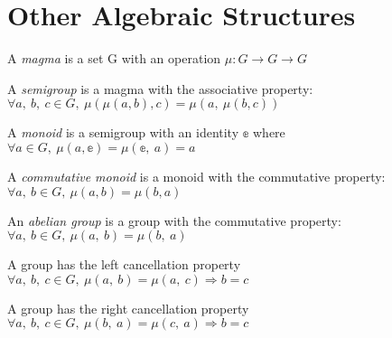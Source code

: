 \section{Other Algebraic Structures}

\begin{definition}[Magma]
    \label{definition : Magma}
    \leanok
    A \emph{magma} is a set G with an operation $\mu : G \rightarrow G \rightarrow G$
\end{definition}

\begin{definition}[Semigroup]
    \label{definition : Semigroup}
    \leanok
    A \emph{semigroup} is a magma with the associative property:
    $\forall a,~ b,~ c \in G, ~\mu(\mu(a, b), c) = \mu(a,~ \mu(b, c))$
\end{definition}

\begin{definition}[Monoid]
    \label{definition : Monoid}
    \leanok
    A \emph{monoid} is a semigroup with an identity $\mathbb{e}$ where
    $\forall a \in G, ~\mu (a, \mathbb{e}) = \mu(\mathbb{e},~ a) = a$
\end{definition}

\begin{definition}
    \label{definition : CommMonoid}
    \leanok
    A \emph{commutative monoid} is a monoid with the commutative property:
    $\forall a,~ b \in G, ~\mu(a, b) = \mu(b, a)$
\end{definition}

\begin{definition}
    \label{definition : AbelianGroup}
    \leanok
    An \emph{abelian group} is a group with the commutative property:
    $\forall a,~ b \in G, ~\mu(a,~ b) = \mu(b,~ a)$
\end{definition}

\begin{theorem}
    \label{definition : left_cancel}
    \leanok
    A group has the left cancellation property
    $\forall a,~ b,~ c \in G, ~\mu(a,~ b) = \mu(a,~ c) \Rightarrow b = c$
\end{theorem}

\begin{theorem}
    \label{definition : right_cancel}
    \leanok
    A group has the right cancellation property
    $\forall a, ~b, ~c \in G,~ \mu(b,~ a) = \mu(c,~ a) \Rightarrow b = c$
  \end{theorem}
